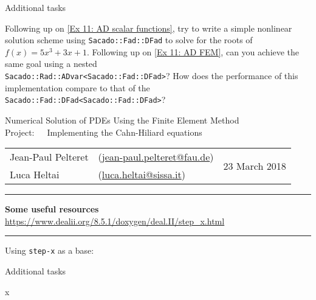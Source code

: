 \documentclass[11pt,answers]{exam}
\makeatletter
\newcommand{\makeprojectheader}[2]{%
\begin{center}
{\sc Numerical Solution of PDEs Using the Finite Element Method}\vspace{2ex}\\
{\sc Project:\ \ \ #1}\vspace{2ex}\\
\begin{tabular*}{\textwidth}{ll @{\extracolsep{\fill}}r}
Jean-Paul Pelteret & (\url{jean-paul.pelteret@fau.de}) & \multirow{2}{*}{#2} \\
Luca Heltai & (\url{luca.heltai@sissa.it}) & \\
\end{tabular*}
\end{center}
}
\newcommand{\makeresources}[1]{%
\rule{\textwidth}{0.6mm}
\textbf{Some useful resources}\\[1.5ex]
#1 \\
\rule{\textwidth}{0.6mm}
}
\makeatother
\begin{document}
\begin{questions}

\question Additional tasks
\begin{parts}
\bonuspart Following up on \ref{Ex 11: AD scalar functions}, try to write a simple nonlinear solution scheme using \verb|Sacado::Fad::DFad| to solve for the roots of $f(x) = 5x^3 + 3x + 1$.
\bonuspart Following up on \ref{Ex 11: AD FEM}, can you achieve the same goal using a nested\\ \verb|Sacado::Rad::ADvar<Sacado::Fad::DFad>|? How does the performance of this implementation compare to that of the \verb|Sacado::Fad::DFad<Sacado::Fad::DFad>|?
\end{parts}

\end{questions}




\clearpage
\makeprojectheader{Implementing the Cahn-Hiliard equations}{23 March 2018}
\makeresources{%
\url{https://www.dealii.org/8.5.1/doxygen/deal.II/step_x.html}
}

\begin{questions}

\question Using \verb|step-x| as a base:

\question Additional tasks
\begin{parts}
\bonuspart x
\end{parts}

\end{questions}
\end{document}
